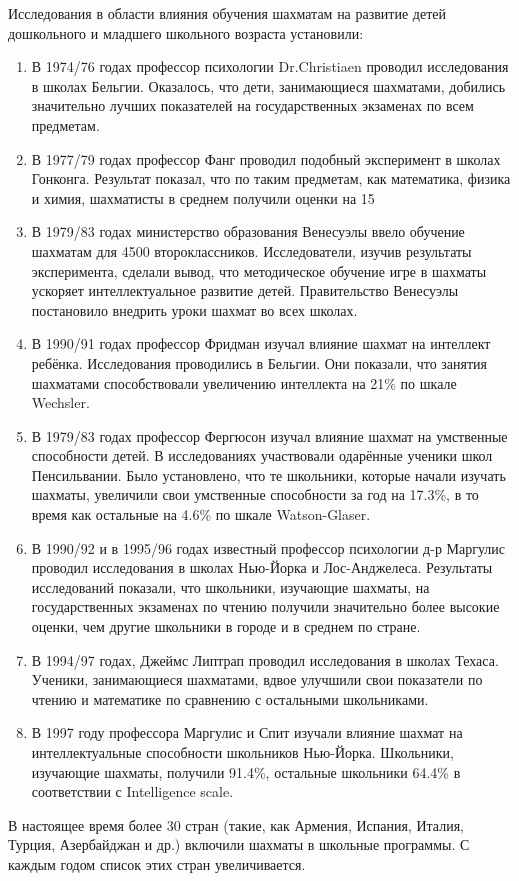 Исследования в области влияния обучения шахматам на развитие детей дошкольного и младшего школьного возраста установили:
\begin{enumerate}
\item В 1974/76 годах профессор психологии Dr.Christiaen проводил исследования в школах Бельгии. Оказалось, что дети, занимающиеся шахматами, добились значительно лучших показателей на государственных экзаменах по всем предметам.
\item В 1977/79 годах профессор Фанг проводил подобный эксперимент в школах Гонконга. Результат показал, что по таким предметам, как математика, физика и химия, шахматисты в среднем получили оценки на 15%
\item В 1979/83 годах министерство образования Венесуэлы ввело обучение шахматам для 4500 второклассников. Исследователи, изучив результаты эксперимента, сделали вывод, что методическое обучение игре в шахматы ускоряет интеллектуальное развитие детей. Правительство Венесуэлы постановило внедрить уроки шахмат во всех школах.
\item В 1990/91 годах профессор Фридман изучал влияние шахмат на интеллект ребёнка. Исследования проводились в Бельгии. Они показали, что занятия шахматами способствовали увеличению интеллекта на 21\% по шкале Wechsler.
\item В 1979/83 годах профессор Фергюсон изучал влияние шахмат на умственные способности детей. В исследованиях участвовали одарённые ученики школ Пенсильвании. Было установлено, что те школьники, которые начали изучать шахматы, увеличили свои умственные способности за год на 17.3\%, в то время как остальные на 4.6\% по шкале Watson-Glaser.
\item В 1990/92 и в 1995/96 годах известный профессор психологии д-р Маргулис проводил исследования в школах Нью-Йорка и Лос-Анджелеса. Результаты исследований показали, что школьники, изучающие шахматы, на государственных экзаменах по чтению получили значительно более высокие оценки, чем другие школьники в городе и в среднем по стране.
\item В 1994/97 годах, Джеймс Липтрап проводил исследования в школах Техаса. Ученики, занимающиеся шахматами, вдвое улучшили свои показатели по чтению и математике по сравнению с остальными школьниками.
\item В 1997 году профессора Маргулис и Спит изучали влияние шахмат на интеллектуальные способности школьников Нью-Йорка. Школьники, изучающие шахматы, получили 91.4\%, остальные школьники 64.4\% в соответствии с Intelligence scale.
\end{enumerate}

В настоящее время более 30 стран (такие, как Армения, Испания, Италия, Турция, Азербайджан и др.) включили шахматы в школьные программы. С каждым годом список этих стран увеличивается.
